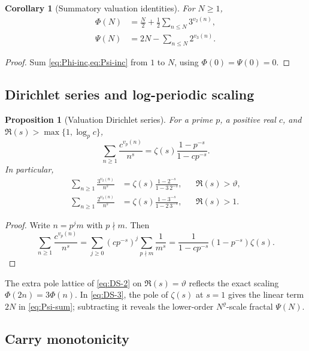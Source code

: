 \documentclass[11pt]{article}
\newtheorem{proposition}[theorem]{Proposition}
\newtheorem{corollary}[theorem]{Corollary}
\theoremstyle{definition}
\begin{document}
\begin{corollary}[Summatory valuation identities]\label{cor:summatory}
For \(N\ge1\),
\begin{align}
 \Phi(N)&=\frac{N}{2}+\frac12\sum_{n\le N}3^{v_2(n)},
 \label{eq:Phi-sum}\\
 \Psi(N)&=2N-\sum_{n\le N}2^{v_3(n)}.
 \label{eq:Psi-sum}
\end{align}
\end{corollary}

\begin{proof}
Sum \cref{eq:Phi-inc,eq:Psi-inc} from \(1\) to \(N\), using
\(\Phi(0)=\Psi(0)=0\).
\end{proof}

\subsection{Dirichlet series and log-periodic scaling}

\begin{proposition}[Valuation Dirichlet series]\label{prop:dirichlet}
For a prime \(p\), a positive real \(c\), and
\(\Re(s)>\max\{1,\log_p c\}\),
\begin{equation}\label{eq:generic-vp-DS}
 \sum_{n\ge1}\frac{c^{v_p(n)}}{n^s}
 =\zeta(s)\frac{1-p^{-s}}{1-cp^{-s}}.
\end{equation}
In particular,
\begin{align}
 \sum_{n\ge1}\frac{3^{v_2(n)}}{n^s}
  &=\zeta(s)\frac{1-2^{-s}}{1-3\,2^{-s}},
  &&\Re(s)>\vartheta,\label{eq:DS-2}\\
 \sum_{n\ge1}\frac{2^{v_3(n)}}{n^s}
  &=\zeta(s)\frac{1-3^{-s}}{1-2\,3^{-s}},
  &&\Re(s)>1.\label{eq:DS-3}
\end{align}
\end{proposition}

\begin{proof}
Write \(n=p^jm\) with \(p\nmid m\).  Then
\[
 \sum_{n\ge1}\frac{c^{v_p(n)}}{n^s}
 =\sum_{j\ge0}(cp^{-s})^j
   \sum_{p\nmid m}\frac1{m^s}
 =\frac{1}{1-cp^{-s}}(1-p^{-s})\zeta(s).
\]
\end{proof}

The extra pole lattice of \cref{eq:DS-2} on
\(\Re(s)=\vartheta\) reflects the exact scaling
\(\Phi(2n)=3\Phi(n)\).  In \cref{eq:DS-3}, the pole of \(\zeta(s)\) at
\(s=1\) gives the linear term \(2N\) in \cref{eq:Psi-sum}; subtracting it
reveals the lower-order \(N^\varrho\)-scale fractal \(\Psi(N)\).

\subsection{Carry monotonicity}
\end{document}
